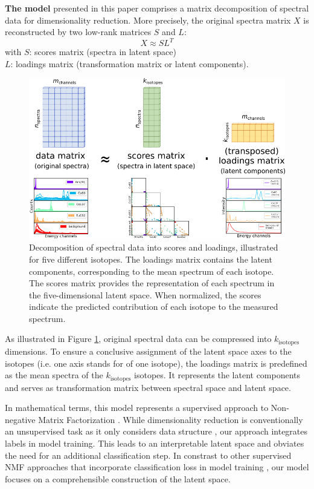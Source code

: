 \documentclass[preprint, 12pt, a4paper]{elsarticle}
\begin{document}
\textbf{The model} presented in this paper comprises a matrix decomposition of spectral data for dimensionality reduction. More precisely, the original spectra matrix $X$ is reconstructed by two low-rank matrices $S$ and $L$:  
$$ X \approx S  L^{T} $$  
with $S$: scores matrix (spectra in latent space) \\  
\hspace*{0.8cm} $L$: loadings matrix (transformation matrix or latent components). \\ 

\begin{figure}
\includegraphics[width=\textwidth]{matrix_decomposition.png}
\caption{Decomposition of spectral data into scores and loadings, illustrated for five different isotopes. The loadings matrix contains the latent components, corresponding to the mean spectrum of each isotope. The scores matrix provides the representation of each spectrum in the five-dimensional latent space. When normalized, the scores indicate the predicted contribution of each isotope to the measured spectrum.}
\label{fig:matrix_decomposition}
\end{figure}

As illustrated in Figure \ref{fig:matrix_decomposition}, original spectral data can be compressed into $k_\mathrm{isotopes}$ dimensions. To ensure a conclusive assignment of the latent space axes to the isotopes (i.e. one axis stands for of one isotope), the loadings matrix is predefined as the mean spectra of the $k_\mathrm{isotopes}$ isotopes. It represents the latent components and serves as transformation matrix between spectral space and latent space.

In mathematical terms, this model represents a supervised approach to Non-negative Matrix Factorization \cite{Shreeves2020, Bilton2019}. While dimensionality reduction is conventionally an unsupervised task as it only considers data structure \cite{Olaya2022}, our approach integrates labels in model training. This leads to an interpretable latent space and obviates the need for an additional classification step. In constrast to other supervised NMF approaches that incorporate classification loss in model training \cite{Leuschner2019, Lee2010, Bisot2016}, our model focuses on a comprehensible construction of the latent space. \\
\end{document}
